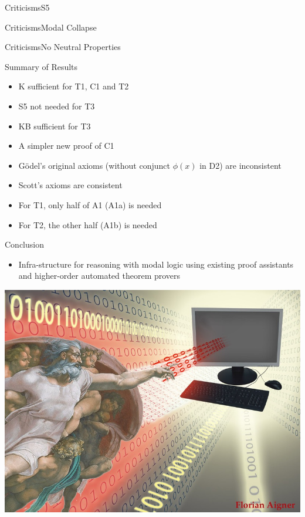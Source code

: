 
\begin{frame}{Criticisms}{S5}

\end{frame}


\begin{frame}{Criticisms}{Modal Collapse}

\end{frame}


\begin{frame}{Criticisms}{No Neutral Properties}

\end{frame}




\begin{frame}{Summary of Results}
\begin{itemize}[<+->]
\item K sufficient for T1, C1 and T2 
\item S5 not needed for T3
\item KB sufficient for T3 
\item A simpler new proof of C1
\item G\"odel's original axioms (without conjunct $\phi(x)$ in D2) are inconsistent
\item Scott's axioms are consistent
\item For T1, only half of A1 (A1a) is needed 
\item For T2, the other half (A1b) is needed
\end{itemize}
\end{frame}


\begin{frame}{Conclusion} \small
\begin{itemize}[<+->]
\item Infra-structure for reasoning with modal logic using existing proof assistants and higher-order automated theorem provers
\end{itemize}
\end{frame}

\begin{frame}[plain]
\includegraphics[width=\textwidth]{TUWien-GodComputerC} 
\end{frame}
